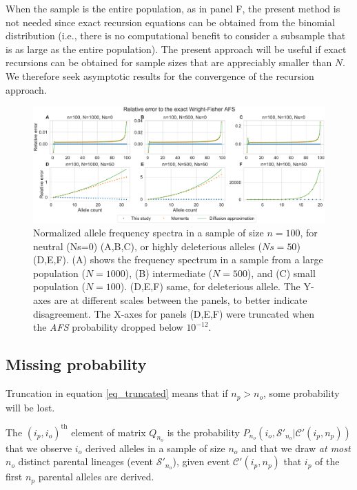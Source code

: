 \documentclass[review]{elsarticle}
\newcommand{\sgcomment}[1]{{\color{red}{SG: #1}}}
\newcommand{\ikcomment}[1]{{\color{blue}{IK: #1}}}
\begin{document}
When the sample is the entire population, as in panel F, the present method is not needed since
exact recursion equations can be obtained from the binomial distribution 
(i.e., there is no computational benefit to consider a subsample that is as large as the entire population). 
The present approach will be useful if exact recursions can be obtained for sample sizes that are appreciably smaller
than $N$. We therefore seek asymptotic results for the convergence of the recursion approach.



\begin{figure}
  \centering
  \includegraphics[width=0.7\textheight]{fig/strong_selection_six_panel.pdf}
  \caption{Normalized allele frequency spectra in a sample of size $n=100$, for neutral (Ns=0)
    (A,B,C), or highly deleterious alleles ($Ns=50$) (D,E,F). (A) shows the frequency spectrum in a
    sample from a large population ($N=1000$), (B) intermediate ($N=500$), and (C) small population
    ($N=100$). (D,E,F) same, for deleterious allele. The Y-axes are at different scales between the
    panels, to better indicate disagreement. The X-axes for panels (D,E,F) were truncated
    when the \textit{AFS} probability dropped below $10^{-12}$. }
  \label{fig_strong-selection}
\end{figure}

\subsection{Missing probability}
\label{subsec_missing}

Truncation in equation \ref{eq_truncated} means that if $n_p > n_o$, some probability will be lost. 
 \sgcomment{Did you do re-normalization of the truncated matrix?} \ikcomment{I did for figure 3, yes}


The $(i_p,i_o)^\text{th}$ element of matrix $Q_{n_o}$ is the probability
$P_{n_o}(i_o, \mathcal{S'}_{n_o}| \mathcal{C'}(i_p,n_p))$ that we observe $i_o$ derived alleles in
a sample of size $n_o$ and that we draw \emph{at most} $n_o$ distinct parental lineages (event
$\mathcal{S'}_{n_o}$), given event $\mathcal{C'}(i_p,n_p)$ that $i_p$ of the first
$n_p$ parental alleles are derived.
\end{document}
